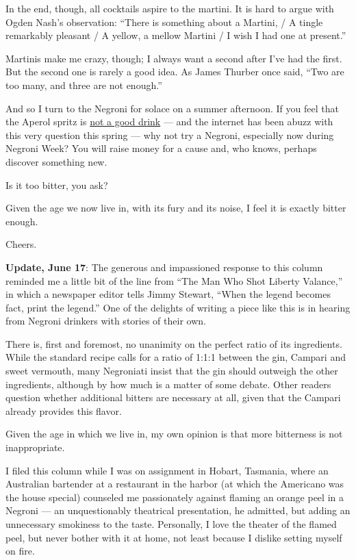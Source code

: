 In the end, though, all cocktails aspire to the martini. It is hard to
argue with Ogden Nash's observation: ``There is something about a
Martini, / A tingle remarkably pleasant / A yellow, a mellow Martini / I
wish I had one at present.''

Martinis make me crazy, though; I always want a second after I've had
the first. But the second one is rarely a good idea. As James Thurber
once said, ``Two are too many, and three are not enough.''

And so I turn to the Negroni for solace on a summer afternoon. If you
feel that the Aperol spritz is
\href{https://www.nytimes.com/2019/05/09/dining/drinks/aperol-spritz.html}{not
a good drink} --- and the internet has been abuzz with this very
question this spring --- why not try a Negroni, especially now during
Negroni Week? You will raise money for a cause and, who knows, perhaps
discover something new.

Is it too bitter, you ask?

Given the age we now live in, with its fury and its noise, I feel it is
exactly bitter enough.

Cheers.

\textbf{Update, June 17}: The generous and impassioned response to this
column reminded me a little bit of the line from ``The Man Who Shot
Liberty Valance,'' in which a newspaper editor tells Jimmy Stewart,
``When the legend becomes fact, print the legend.'' One of the delights
of writing a piece like this is in hearing from Negroni drinkers with
stories of their own.

There is, first and foremost, no unanimity on the perfect ratio of its
ingredients. While the standard recipe calls for a ratio of 1:1:1
between the gin, Campari and sweet vermouth, many Negroniati insist that
the gin should outweigh the other ingredients, although by how much is a
matter of some debate. Other readers question whether additional bitters
are necessary at all, given that the Campari already provides this
flavor.

Given the age in which we live in, my own opinion is that more
bitterness is not inappropriate.

I filed this column while I was on assignment in Hobart, Tasmania, where
an Australian bartender at a restaurant in the harbor (at which the
Americano was the house special) counseled me passionately against
flaming an orange peel in a Negroni --- an unquestionably theatrical
presentation, he admitted, but adding an unnecessary smokiness to the
taste. Personally, I love the theater of the flamed peel, but never
bother with it at home, not least because I dislike setting myself on
fire.

